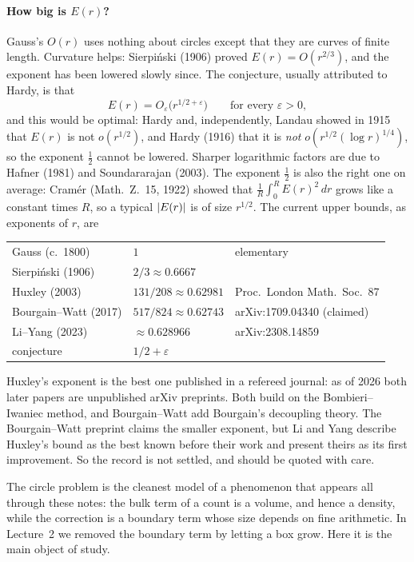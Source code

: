 \paragraph{How big is $E(r)$?} Gauss's $O(r)$ uses nothing about circles except that they are curves
of finite length. Curvature helps: Sierpi\'nski (1906) proved $E(r)=O(r^{2/3})$, and the exponent has
been lowered slowly since. The conjecture, usually attributed to Hardy, is that
\[
  E(r)=O_\varepsilon\big(r^{1/2+\varepsilon}\big)\qquad\text{for every }\varepsilon>0,
\]
and this would be optimal: Hardy and, independently, Landau showed in 1915 that $E(r)$ is not
$o(r^{1/2})$, and Hardy (1916) that it is \emph{not} $o(r^{1/2}(\log r)^{1/4})$, so the
exponent $\frac12$ cannot be lowered. Sharper logarithmic factors are due to Hafner (1981) and
Soundararajan (2003). The exponent $\frac12$ is also the right one on average: Cram\'er (Math.\ Z.\ 15,
1922) showed
that $\frac{1}{R}\int_0^RE(r)^2\,dr$ grows like a constant times $R$, so a typical $\left\lvert E(r) \right\rvert$ is of
size $r^{1/2}$. The current upper bounds, as exponents of $r$, are
\begin{center}
\renewcommand{\arraystretch}{1.15}
\begin{tabular}{lll}
\toprule
Gauss (c.~1800) & $1$ & elementary\\
Sierpi\'nski (1906) & $2/3\approx0.6667$ & \\
Huxley (2003) & $131/208\approx0.62981$ & Proc.\ London Math.\ Soc.\ 87\\
Bourgain--Watt (2017) & $517/824\approx0.62743$ & arXiv:1709.04340 (claimed)\\
Li--Yang (2023) & $\approx0.628966$ & arXiv:2308.14859\\
conjecture & $1/2+\varepsilon$ & \\
\bottomrule
\end{tabular}
\end{center}
Huxley's exponent is the best one published in a refereed journal: as of 2026 both later papers are
unpublished arXiv preprints. Both build on the Bombieri--Iwaniec method, and Bourgain--Watt add
Bourgain's decoupling theory. The Bourgain--Watt preprint claims the smaller exponent, but Li and Yang
describe Huxley's bound as the best known before their work and present theirs as its first improvement.
So the record is not settled, and should be quoted with care.

\begin{remark}
The circle problem is the cleanest model of a phenomenon that appears all through these notes: the bulk
term of a count is a volume, and hence a density, while the correction is a boundary term whose size
depends on fine arithmetic. In Lecture~2 we removed the boundary term by letting a box grow. Here it is
the main object of study.
\end{remark}

